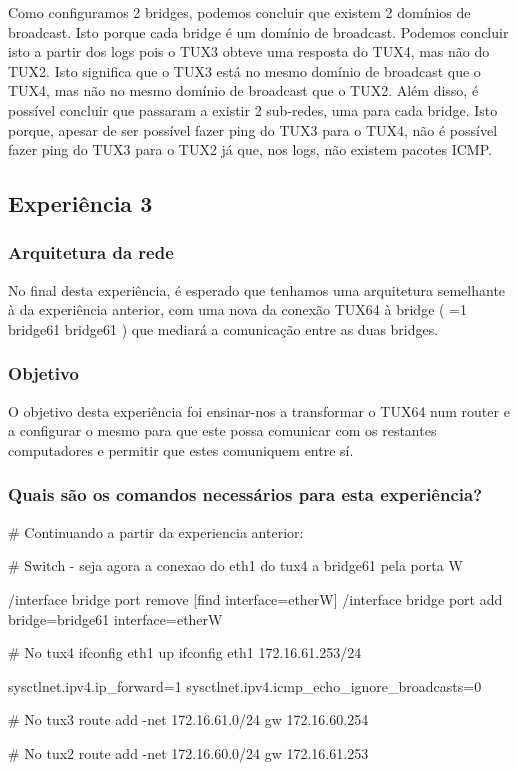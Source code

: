 \documentclass[11pt,a4paper,twocolumn]{article}
\newcommand{\hl}[2][1]{%
  \ifnum#1=1\relax
    \textcolor{text-hl1}{#2}%
  \else
    \textcolor{text-hl2}{#2}%
  \fi
}
\begin{document}
Como configuramos 2 bridges, podemos concluir que existem 2 domínios de broadcast. Isto porque cada bridge é um domínio de broadcast. Podemos concluir isto a partir dos logs pois o TUX3 obteve uma resposta do TUX4, mas não do TUX2. Isto significa que o TUX3 está no mesmo domínio de broadcast que o TUX4, mas não no mesmo domínio de broadcast que o TUX2.
Além disso, é possível concluir que passaram a existir 2 sub-redes, uma para cada bridge. Isto porque, apesar de ser possível fazer ping do TUX3 para o TUX4, não é possível fazer ping do TUX3 para o TUX2 já que, nos logs, não existem pacotes ICMP.

\subsection{Experiência 3}

\subsubsection{Arquitetura da rede}

No final desta experiência, é esperado que tenhamos uma arquitetura semelhante à da experiência anterior, com uma nova da conexão TUX64 à bridge (\hl{bridge61}) que mediará a comunicação entre as duas bridges.

\subsubsection{Objetivo}

O objetivo desta experiência foi ensinar-nos a transformar o TUX64 num router e a configurar o mesmo para que este possa comunicar com os restantes computadores e permitir que estes comuniquem entre sí.

\subsubsection{Quais são os comandos necessários para esta experiência?}

\begin{bash-darktheme}
        # Continuando a partir da experiencia anterior:

        # Switch - seja agora a conexao do eth1 do tux4 a bridge61 pela porta W

        /interface bridge port remove [find interface=etherW]
        /interface bridge port add bridge=bridge61 interface=etherW

        # No tux4
        ifconfig eth1 up
        ifconfig eth1 172.16.61.253/24

        sysctlnet.ipv4.ip_forward=1
        sysctlnet.ipv4.icmp_echo_ignore_broadcasts=0
        
        # No tux3
        route add -net 172.16.61.0/24 gw 172.16.60.254
        
        # No tux2
        route add -net 172.16.60.0/24 gw 172.16.61.253

\end{bash-darktheme}
\end{document}
